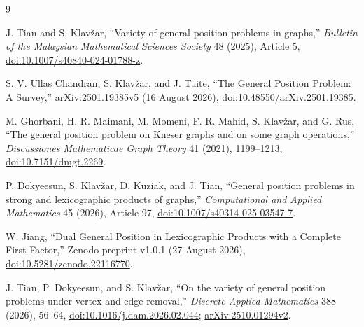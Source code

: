 \documentclass[preprint,12pt]{elsarticle}
\numberwithin{equation}{section}
\begin{document}
\begin{thebibliography}{9}

J. Tian and S. Klav\v{z}ar, ``Variety of general position problems
in graphs,'' \emph{Bulletin of the Malaysian Mathematical Sciences
Society} 48 (2025), Article 5,
\href{https://doi.org/10.1007/s40840-024-01788-z}{doi:10.1007/s40840-024-\mbox{01788-z}}.

S. V. Ullas Chandran, S. Klav\v{z}ar, and J. Tuite, ``The General
Position Problem: A Survey,'' arXiv:2501.19385v5 (16 August 2026),
\href{https://doi.org/10.48550/arXiv.2501.19385}{doi:10.48550/arXiv.2501.19385}.

M. Ghorbani, H. R. Maimani, M. Momeni, F. R. Mahid, S. Klav\v{z}ar,
and G. Rus, ``The general position problem on Kneser graphs and on some
graph operations,'' \emph{Discussiones Mathematicae Graph Theory} 41
(2021), 1199--1213,
\href{https://doi.org/10.7151/dmgt.2269}{doi:10.7151/dmgt.2269}.

P. Dokyeesun, S. Klav\v{z}ar, D. Kuziak, and J. Tian, ``General
position problems in strong and lexicographic products of graphs,''
\emph{Computational and Applied Mathematics} 45 (2026), Article 97,
\href{https://doi.org/10.1007/s40314-025-03547-7}{doi:10.1007/s40314-025-03547-7}.

W. Jiang, ``Dual General Position in Lexicographic Products with
a Complete First Factor,'' Zenodo preprint v1.0.1 (27 August 2026),
\href{https://doi.org/10.5281/zenodo.22116770}{doi:10.5281/zenodo.22116770}.

J. Tian, P. Dokyeesun, and S. Klav\v{z}ar, ``On the variety of
general position problems under vertex and edge removal,''
\emph{Discrete Applied Mathematics} 388 (2026), 56--64,
\href{https://doi.org/10.1016/j.dam.2026.02.044}{doi:10.1016/j.dam.2026.02.044};
\href{https://arxiv.org/abs/2510.01294v2}{arXiv:2510.01294v2}.

\end{thebibliography}
\end{document}
